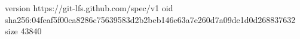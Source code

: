 version https://git-lfs.github.com/spec/v1
oid sha256:04feaf5f00ca8286c75639583d2b2beb146e63a7e260d7a09de1d0d268837632
size 43840

